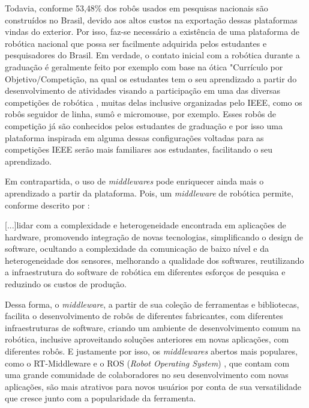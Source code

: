 Todavia, conforme  53,48\% dos robôs usados em pesquisas nacionais são construídos no Brasil, devido aos altos custos na exportação dessas plataformas vindas do exterior. Por isso, faz-se necessário a existência de uma plataforma de robótica nacional que possa ser facilmente adquirida pelos estudantes e pesquisadores do Brasil. Em verdade, o contato inicial com a robótica durante a graduação é geralmente feito por exemplo com base na ótica "Currículo por Objetivo/Competição, na qual os estudantes tem o seu aprendizado a partir do desenvolvimento de atividades visando a participação em uma das diversas competições de robótica \cite{Campos2017}, muitas delas inclusive organizadas pelo IEEE, como os robôs seguidor de linha, sumô e micromouse, por exemplo. Esses robôs de competição já são conhecidos pelos estudantes de graduação e por isso uma plataforma inspirada em alguma dessas configurações voltadas para as competições IEEE serão mais familiares aos estudantes, facilitando o seu aprendizado. 

Em contrapartida, o uso de \textit{middlewares} pode enriquecer ainda mais o aprendizado a partir da plataforma. Pois, um \textit{middleware} de robótica permite, conforme descrito por :

\begin{quoting}[rightmargin=0cm,leftmargin=4cm]
	\begin{singlespace}
		{\footnotesize
			[...]lidar com a complexidade e heterogeneidade encontrada em aplicações de hardware, promovendo integração de novas tecnologias, simplificando o design de software, ocultando a complexidade da comunicação de baixo nível e da heterogeneidade dos sensores, melhorando a qualidade dos softwares, reutilizando a infraestrutura do software de robótica em diferentes esforços de pesquisa e reduzindo os custos de produção.
		}
	\end{singlespace}
\end{quoting}

Dessa forma, o \textit{middleware}, a partir de sua coleção de ferramentas e bibliotecas, facilita o desenvolvimento de robôs de diferentes fabricantes, com diferentes infraestruturas de software, criando um ambiente de desenvolvimento comum na robótica, inclusive aproveitando soluções anteriores em novas aplicações, com diferentes robôs. E justamente por isso, os \textit{middlewares} abertos mais populares, como o RT-Middleware e o ROS (\textit{Robot Operating System}) \cite{Elkady2012}, que contam com uma grande comunidade de colaboradores no seu desenvolvimento com novas aplicações, são mais atrativos para novos usuários por conta de sua versatilidade que cresce junto com a popularidade da ferramenta.

